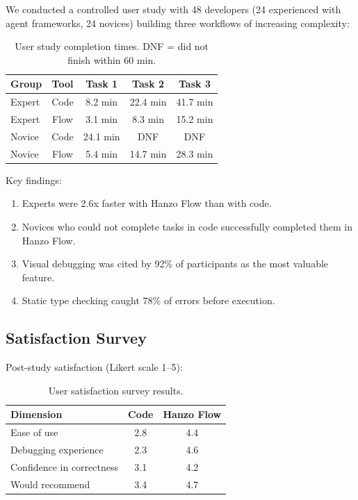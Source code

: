 \documentclass[11pt,twocolumn]{article}
\begin{document}
We conducted a controlled user study with 48 developers (24 experienced with agent frameworks, 24 novices) building three workflows of increasing complexity:

\begin{table}[H]
\centering
\small
\begin{tabular}{lcccc}
\toprule
\textbf{Group} & \textbf{Tool} & \textbf{Task 1} & \textbf{Task 2} & \textbf{Task 3} \\
\midrule
Expert & Code & 8.2 min & 22.4 min & 41.7 min \\
Expert & Flow & 3.1 min & 8.3 min & 15.2 min \\
Novice & Code & 24.1 min & DNF & DNF \\
Novice & Flow & 5.4 min & 14.7 min & 28.3 min \\
\bottomrule
\end{tabular}
\caption{User study completion times. DNF = did not finish within 60 min.}
\label{tab:userstudy}
\end{table}

Key findings:
\begin{enumerate}[leftmargin=1.4em]
    \item Experts were 2.6x faster with Hanzo Flow than with code.
    \item Novices who could not complete tasks in code successfully completed them in Hanzo Flow.
    \item Visual debugging was cited by 92\% of participants as the most valuable feature.
    \item Static type checking caught 78\% of errors before execution.
\end{enumerate}

\subsection{Satisfaction Survey}

Post-study satisfaction (Likert scale 1--5):

\begin{table}[H]
\centering
\small
\begin{tabular}{lcc}
\toprule
\textbf{Dimension} & \textbf{Code} & \textbf{Hanzo Flow} \\
\midrule
Ease of use & 2.8 & 4.4 \\
Debugging experience & 2.3 & 4.6 \\
Confidence in correctness & 3.1 & 4.2 \\
Would recommend & 3.4 & 4.7 \\
\bottomrule
\end{tabular}
\caption{User satisfaction survey results.}
\label{tab:satisfaction}
\end{table}
\end{document}
